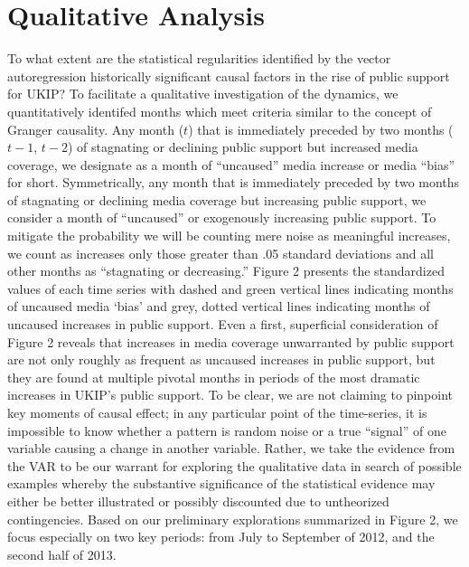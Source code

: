 \documentclass[12pt,article]{article}
\begin{document}
\section{Qualitative Analysis}\label{qualitative-analysis}

To what extent are the statistical regularities identified by the vector
autoregression historically significant causal factors in the rise of
public support for UKIP? To facilitate a qualitative investigation of
the dynamics, we quantitatively identifed months which meet criteria
similar to the concept of Granger causality. Any month (\(t\)) that is
immediately preceded by two months (\(t-1\), \(t-2\)) of stagnating or
declining public support but increased media coverage, we designate as a
month of ``uncaused'' media increase or media ``bias'' for short.
Symmetrically, any month that is immediately preceded by two months of
stagnating or declining media coverage but increasing public support, we
consider a month of ``uncaused'' or exogenously increasing public
support. To mitigate the probability we will be counting mere noise as
meaningful increases, we count as increases only those greater than .05
standard deviations and all other months as ``stagnating or
decreasing.'' Figure 2 presents the standardized values of each time
series with dashed and green vertical lines indicating months of
uncaused media `bias' and grey, dotted vertical lines indicating months
of uncaused increases in public support. Even a first, superficial
consideration of Figure 2 reveals that increases in media coverage
unwarranted by public support are not only roughly as frequent as
uncaused increases in public support, but they are found at multiple
pivotal months in periods of the most dramatic increases in UKIP's
public support. To be clear, we are not claiming to pinpoint key moments
of causal effect; in any particular point of the time-series, it is
impossible to know whether a pattern is random noise or a true
``signal'' of one variable causing a change in another variable. Rather,
we take the evidence from the VAR to be our warrant for exploring the
qualitative data in search of possible examples whereby the substantive
significance of the statistical evidence may either be better
illustrated or possibly discounted due to untheorized contingencies.
Based on our preliminary explorations summarized in Figure 2, we focus
especially on two key periods: from July to September of 2012, and the
second half of 2013.
\end{document}
